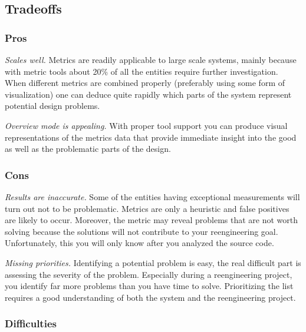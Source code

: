 \documentclass[a4paper,10pt,twoside]{book}
\begin{document}
\subsection*{Tradeoffs}

\subsubsection*{Pros}

\begin{bulletlist}
\item \emph{Scales well.}
Metrics are readily applicable to large scale systems, mainly because with metric tools 
about 20\% of all the entities require further investigation. When different metrics are 
combined properly (preferably using some form of visualization) one can deduce quite 
rapidly which parts of the system represent potential design problems.

\item \emph{Overview mode is appealing.}
With proper tool support you can produce visual representations of the metrics data that 
provide immediate insight into the good as well as the problematic parts of the design.
\end{bulletlist}

\subsubsection*{Cons}

\begin{bulletlist}
\item \emph{Results are inaccurate.}
Some of the entities having exceptional measurements will turn out not to be problematic. 
Metrics are only a heuristic and false positives are likely to occur. Moreover, the metric 
may reveal problems that are not worth solving because the solutions will not contribute to 
your reengineering goal. Unfortunately, this you will only know after you analyzed the 
source code.

\item \emph{Missing priorities.}
Identifying a potential problem is easy, the real difficult part is assessing the severity 
of the problem. Especially during a reengineering project, you identify far more problems 
than you have time to solve. Prioritizing the list requires a good understanding of both 
the system and the reengineering project.
\end{bulletlist}

\subsubsection*{Difficulties}
\end{document}
